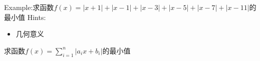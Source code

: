 \clearpage
Example:求函数$f(x)=|x+1|+|x-1|+|x-3|+|x-5|+|x-7|+|x-11|$的最小值
\clearpage
Hints:
\begin{itemize}
\item 几何意义
\end{itemize}

\clearpage
求函数$f(x)=\sum_{i=1}^n|a_ix+b_i|$的最小值

